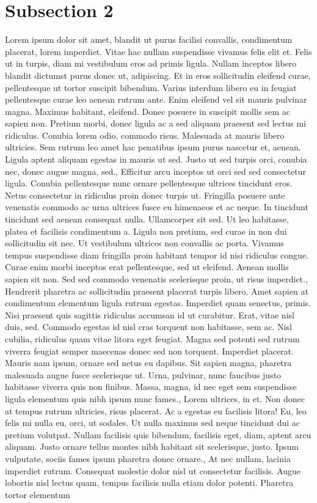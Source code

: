 \documentclass{source/tex/templates/maththesis}
\begin{document}
\hypertarget{subsection-2-1}{%
\section{Subsection 2}\label{subsection-2-1}}

Lorem ipsum dolor sit amet, blandit ut purus facilisi convallis, condimentum placerat, lorem imperdiet. Vitae hac nullam suspendisse vivamus felis elit et. Felis ut in turpis, diam mi vestibulum eros ad primis ligula. Nullam inceptos libero blandit dictumst purus donec ut, adipiscing. Et in eros sollicitudin eleifend curae, pellentesque ut tortor suscipit bibendum. Varius interdum libero eu in feugiat pellentesque curae leo aenean rutrum ante. Enim eleifend vel sit mauris pulvinar magna. Maximus habitant, eleifend. Donec posuere in suscipit mollis sem ac sapien non. Pretium morbi, donec ligula ac a sed aliquam praesent sed lectus mi ridiculus. Conubia lorem odio, commodo risus. Malesuada at mauris libero ultricies. Sem rutrum leo amet hac penatibus ipsum purus nascetur et, aenean. Ligula aptent aliquam egestas in mauris ut sed. Justo ut sed turpis orci, conubia nec, donec augue magna, sed., Efficitur arcu inceptos ut orci sed sed consectetur ligula. Conubia pellentesque nunc ornare pellentesque ultrices tincidunt eros. Netus consectetur in ridiculus proin donec turpis ut. Fringilla posuere ante venenatis commodo ac urna ultrices fusce eu himenaeos et ac neque. In tincidunt tincidunt sed aenean consequat nulla. Ullamcorper sit sed. Ut leo habitasse, platea et facilisis condimentum a. Ligula non pretium, sed curae in non dui sollicitudin sit nec. Ut vestibulum ultrices non convallis ac porta. Vivamus tempus suspendisse diam fringilla proin habitant tempor id nisi ridiculus congue. Curae enim morbi inceptos erat pellentesque, sed ut eleifend. Aenean mollis sapien sit non. Sed sed commodo venenatis scelerisque proin, ut risus imperdiet., Hendrerit pharetra ac sollicitudin praesent placerat turpis libero. Amet sapien at condimentum elementum ligula rutrum egestas. Imperdiet quam senectus, primis. Nisi praesent quis sagittis ridiculus accumsan id ut curabitur. Erat, vitae nisl duis, sed. Commodo egestas id nisl cras torquent non habitasse, sem ac. Nisl cubilia, ridiculus quam vitae litora eget feugiat. Magna sed potenti sed rutrum viverra feugiat semper maecenas donec sed non torquent. Imperdiet placerat. Mauris nam ipsum, ornare sed netus eu dapibus. Sit sapien magna, pharetra malesuada augue fusce scelerisque ut. Urna, pulvinar, nunc faucibus justo habitasse viverra quis non finibus. Massa, magna, id nec eget sem suspendisse ligula elementum quis nibh ipsum nunc fames., Lorem ultrices, in et. Non donec at tempus rutrum ultricies, risus placerat. Ac a egestas eu facilisis litora! Eu, leo felis mi nulla eu, orci, ut sodales. Ut nulla maximus sed neque tincidunt dui ac pretium volutpat. Nullam facilisis quis bibendum, facilisis eget, diam, aptent arcu aliquam. Justo ornare tellus montes nibh habitant sit scelerisque, justo. Ipsum vulputate, sociis fames ipsum pharetra donec ornare., At nec nullam, lacinia imperdiet rutrum. Consequat molestie dolor nisl ut consectetur facilisis. Augue lobortis nisl lectus quam, tempus facilisis nulla etiam dolor potenti. Pharetra tortor elementum 
\end{document}
